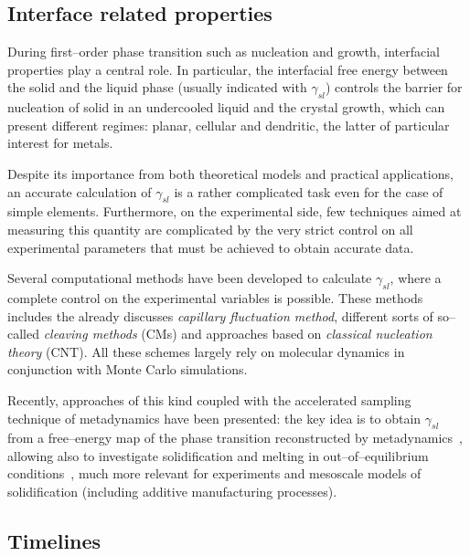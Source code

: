 \subsection{Interface related properties}
During first--order phase transition such as nucleation and growth, interfacial properties play a central role. In particular, the interfacial free energy between the solid and the liquid phase (usually indicated with $\gamma_{sl}$) controls the barrier for nucleation of solid in an undercooled liquid and the crystal growth, which can present different regimes: planar, cellular and dendritic, the latter of particular interest for metals.

Despite its importance from both theoretical models and practical applications, an accurate calculation of $\gamma_{sl}$ is a rather complicated task even for the case of simple elements. Furthermore, on the experimental side, few techniques aimed at measuring this quantity are complicated by the very strict control on all experimental parameters that must be achieved to obtain accurate data.%

Several computational methods have been developed to calculate $\gamma_{sl}$, where a complete control on the experimental variables is possible. These methods includes the already discusses \emph{capillary fluctuation method}, different sorts of so--called \emph{cleaving methods} (CMs) and approaches based on \emph{classical nucleation theory} (CNT). All these schemes largely rely on molecular dynamics in conjunction with Monte Carlo simulations.

Recently, approaches of this kind coupled with the accelerated sampling technique of metadynamics have been presented: the key idea is to obtain $\gamma_{sl}$ from a free--energy map of the phase transition reconstructed by metadynamics~\cite{Angioletti-Uberti2010}, allowing also to investigate solidification and melting in out--of--equilibrium conditions~\cite{Cheng2015}, much more relevant for experiments and mesoscale models of solidification (including additive manufacturing processes).




\subsection{Timelines}